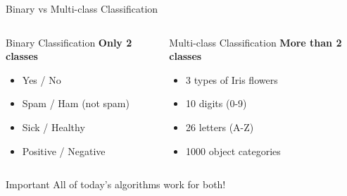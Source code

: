 \documentclass[aspectratio=169]{beamer}
\begin{document}
\begin{frame}{Binary vs Multi-class Classification}
\begin{columns}[T]
\begin{block}{Binary Classification}
\textbf{Only 2 classes}
\begin{itemize}
    \item Yes / No
    \item Spam / Ham (not spam)
    \item Sick / Healthy
    \item Positive / Negative
\end{itemize}
\end{block}

\begin{block}{Multi-class Classification}
\textbf{More than 2 classes}
\begin{itemize}
    \item 3 types of Iris flowers
    \item 10 digits (0-9)
    \item 26 letters (A-Z)
    \item 1000 object categories
\end{itemize}
\end{block}
\end{columns}

\vspace{0.5cm}
\begin{alertblock}{Important}
All of today's algorithms work for both!
\end{alertblock}
\end{frame}
\end{document}
